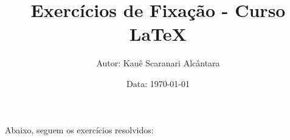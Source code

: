 \documentclass[a4paper, 12pt]{article}
\title{{\LARGE \textbf{Exercícios de Fixação - Curso LaTeX}}}
\author{Autor: Kauê Scaranari Alcântara}
\date{Data: \today}
\begin{document}
\maketitle
Abaixo, seguem os exercícios resolvidos:
\end{document}
